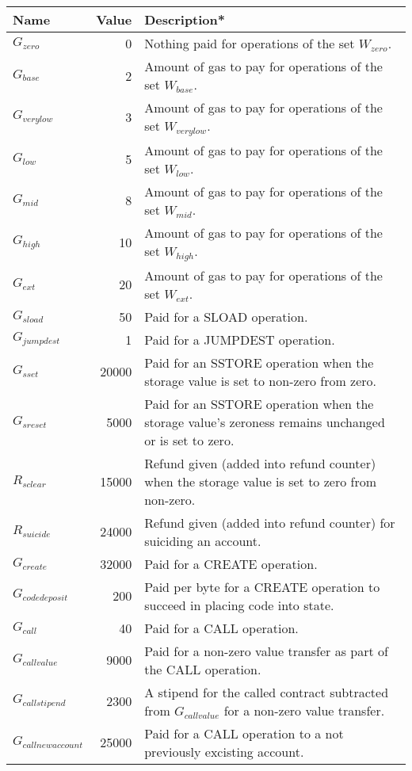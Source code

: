 \documentclass[9pt,oneside]{amsart}
\begin{document}
\begin{tabular*}{\columnwidth}[h]{lrl}
\toprule
Name & Value & Description* \\
\midrule
$G_{zero}$ & 0 & Nothing paid for operations of the set {\small $W_{zero}$}. \\
$G_{base}$ & 2 & Amount of gas to pay for operations of the set {\small $W_{base}$}. \\
$G_{verylow}$ & 3 & Amount of gas to pay for operations of the set {\small $W_{verylow}$}. \\
$G_{low}$ & 5 & Amount of gas to pay for operations of the set {\small $W_{low}$}. \\
$G_{mid}$ & 8 & Amount of gas to pay for operations of the set {\small $W_{mid}$}. \\
$G_{high}$ & 10 & Amount of gas to pay for operations of the set {\small $W_{high}$}. \\
$G_{ext}$ & 20 & Amount of gas to pay for operations of the set {\small $W_{ext}$}. \\
$G_{sload}$ & 50 & Paid for a {\small SLOAD} operation. \\
$G_{jumpdest}$ & 1 & Paid for a {\small JUMPDEST} operation. \\
$G_{sset}$ & 20000 & Paid for an {\small SSTORE} operation when the storage value is set to non-zero from zero. \\
$G_{sreset}$ & 5000 & Paid for an {\small SSTORE} operation when the storage value's zeroness remains unchanged or is set to zero. \\
$R_{sclear}$ & 15000 & Refund given (added into refund counter) when the storage value is set to zero from non-zero. \\
$R_{suicide}$ & 24000 & Refund given (added into refund counter) for suiciding an account. \\
$G_{create}$ & 32000 & Paid for a {\small CREATE} operation. \\
$G_{codedeposit}$ & 200 & Paid per byte for a {\small CREATE} operation to succeed in placing code into state. \\
$G_{call}$ & 40 & Paid for a {\small CALL} operation. \\
$G_{callvalue}$ & 9000 & Paid for a non-zero value transfer as part of the {\small CALL} operation. \\
$G_{callstipend}$ & 2300 & A stipend for the called contract subtracted from $G_{callvalue}$ for a non-zero value transfer. \\
$G_{callnewaccount}$ & 25000 & Paid for a {\small CALL} operation to a not previously excisting account. \\

\end{tabular*}
\end{document}
